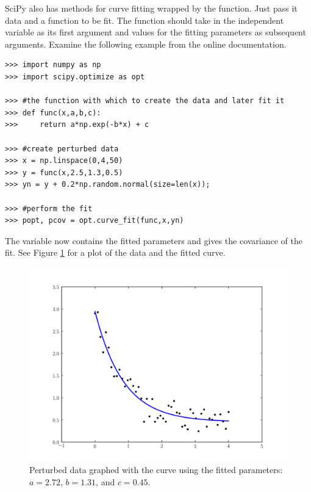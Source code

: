 
SciPy also has methods for curve fitting wrapped by the  function.
Just pass it data and a function to be fit. 
The function should take in the independent variable as its first argument and values for the fitting parameters as subsequent arguments.
Examine the following example from the online documentation.
\begin{lstlisting}
>>> import numpy as np
>>> import scipy.optimize as opt

>>> #the function with which to create the data and later fit it
>>> def func(x,a,b,c):
>>>     return a*np.exp(-b*x) + c

>>> #create perturbed data
>>> x = np.linspace(0,4,50)
>>> y = func(x,2.5,1.3,0.5)
>>> yn = y + 0.2*np.random.normal(size=len(x));

>>> #perform the fit
>>> popt, pcov = opt.curve_fit(func,x,yn)
\end{lstlisting}
The variable  now contains the fitted parameters and  gives the covariance of the fit.
See Figure \ref{opt:curve_fit} for a plot of the data and the fitted curve.

\begin{figure}
\includegraphics[width=\textwidth]{curve_fit.pdf}
\caption{Perturbed data graphed with the curve using the fitted parameters: $a=2.72$,  $b=1.31$, and $c=0.45$.}
\label{opt:curve_fit}
\end{figure}

